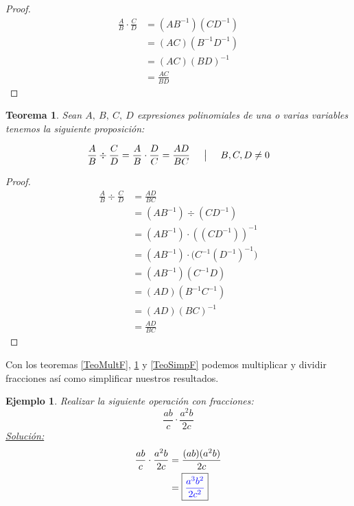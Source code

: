 \documentclass[A4paper, 10pt, oneside]{book}
\newtheorem{theorem}{Teorema}[chapter]
\newtheorem{example}{Ejemplo}[chapter]
\begin{document}
	\begin{proof}
		\begin{align*}
			\frac{A}{B}\cdot \frac{C}{D} &= (AB^{-1})(CD^{-1})\\
			&=(AC)(B^{-1}D^{-1})\\
			&=(AC)(BD)^{-1}\\
			&=\frac{AC}{BD}
		\end{align*}
	\end{proof}

	\begin{theorem}
		\label{TeoDivF}
		Sean $A, \ B, \ C, \ D$ expresiones polinomiales de una o varias variables tenemos la siguiente proposición: 
		
		$$\frac{A}{B}\div \frac{C}{D} = \frac{A}{B} \cdot \frac{D}{C} = \frac{AD}{BC} \hspace{5mm} \big| \hspace{5mm} B, C, D \neq 0$$
	\end{theorem}
	
	\begin{proof}
		\begin{align*}
			\frac{A}{B}\div \frac{C}{D} &= \frac{AD}{BC}\\
			&=(AB^{-1})\div(CD^{-1})\\
			&=(AB^{-1})\cdot \left((CD^{-1})\right)^{-1}\\
			&=(AB^{-1})\cdot \big(C^{-1}(D^{-1})^{-1}\big)\\
			&=(AB^{-1})(C^{-1}D)\\
			&=(AD)(B^{-1}C^{-1})\\
			&=(AD)(BC)^{-1}\\
			&=\frac{AD}{BC}
		\end{align*}
	\end{proof}

	Con los teoremas \ref{TeoMultF}, \ref{TeoDivF} y \ref{TeoSimpF} podemos multiplicar y dividir fracciones así como simplificar nuestros resultados.
	
	\begin{example}
		Realizar la siguiente operación con fracciones: $$\frac{ab}{c}\cdot\frac{a^2b}{2c}$$
		\underline{Solución:}
		\begin{align*}
			\frac{ab}{c}\cdot\frac{a^2b}{2c} &= \frac{(ab)(a^2b)}{2c}\\
			&=\fbox{{\color{blue}$\displaystyle{\frac{a^3b^2}{2c^2}}$}}
		\end{align*}
	\end{example}
\end{document}
